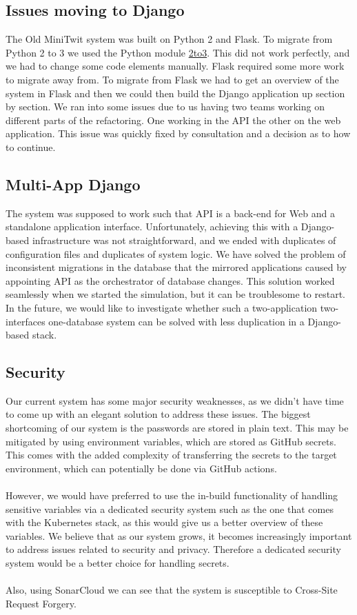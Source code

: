 \documentclass[11pt]{article}
\begin{document}
\subsection{Issues moving to Django}
The Old MiniTwit system was built on Python 2 and Flask. To migrate from Python 2 to 3 we used the Python module \href{https://docs.python.org/3/library/2to3.html}{2to3}. This did not work perfectly, and we had to change some code elements manually. Flask required some more work to migrate away from. To migrate from Flask we had to get an overview of the system in Flask and then we could then build the Django application up section by section. We ran into some issues due to us having two teams working on different parts of the refactoring. One working in the API the other on the web application. This issue was quickly fixed by consultation and a decision as to how to continue.

\subsection{Multi-App Django}

The system was supposed to work such that API is a back-end for Web and a standalone application interface. Unfortunately, achieving this with a Django-based infrastructure was not straightforward, and we ended with duplicates of configuration files and duplicates of system logic. We have solved the problem of inconsistent migrations in the database that the mirrored applications caused by appointing API as the orchestrator of database changes. This solution worked seamlessly when we started the simulation, but it can be troublesome to restart. In the future, we would like to investigate whether such a two-application two-interfaces one-database system can be solved with less duplication in a Django-based stack.


\subsection{Security}
Our current system has some major security weaknesses, as we didn't have time to come up with an elegant solution to address these issues. The biggest shortcoming of our system is the passwords are stored in plain text. This may be mitigated by using environment variables, which are stored as GitHub secrets. This comes with the added complexity of transferring the secrets to the target environment, which can potentially be done via GitHub actions. 
\\\\
However, we would have preferred to use the in-build functionality of handling sensitive variables via a dedicated security system such as the one that comes with the Kubernetes stack, as this would give us a better overview of these variables. We believe that as our system grows, it becomes increasingly important to address issues related to security and privacy. Therefore a dedicated security system would be a better choice for handling secrets. 
\\\\
Also, using SonarCloud we can see that the system is susceptible to Cross-Site Request Forgery.
\end{document}
